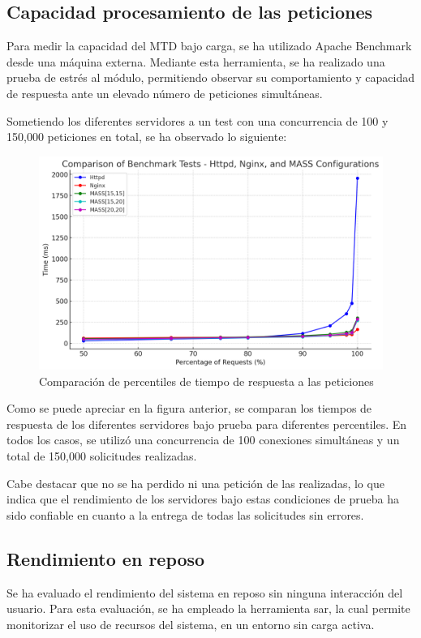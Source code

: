 \subsection{Capacidad procesamiento de las peticiones}
Para medir la capacidad del MTD bajo carga, se ha utilizado Apache Benchmark desde una máquina externa. Mediante esta herramienta, se ha realizado una prueba de estrés al módulo, permitiendo observar su comportamiento y capacidad de respuesta ante un elevado número de peticiones simultáneas.

Sometiendo los diferentes servidores a un test con una concurrencia de 100 y 150,000 peticiones en total, se ha observado lo siguiente:

\begin{figure}[h]
    \centering
    \includegraphics[width=\linewidth]{./imagenes/comparison.png}
    \caption{Comparación de percentiles de tiempo de respuesta a las peticiones}
\end{figure}

Como se puede apreciar en la figura anterior, se comparan los tiempos de respuesta de los diferentes servidores bajo prueba para diferentes percentiles. En todos los casos, se utilizó una concurrencia de 100 conexiones simultáneas y un total de 150,000 solicitudes realizadas.

Cabe destacar que no se ha perdido ni una petición de las realizadas, lo que indica que el rendimiento de los servidores bajo estas condiciones de prueba ha sido confiable en cuanto a la entrega de todas las solicitudes sin errores.


\subsection{Rendimiento en reposo}
Se ha evaluado el rendimiento del sistema en reposo sin ninguna interacción del usuario. Para esta evaluación, se ha empleado la herramienta sar\cite{sar}, la cual permite monitorizar el uso de recursos del sistema, en un entorno sin carga activa.

